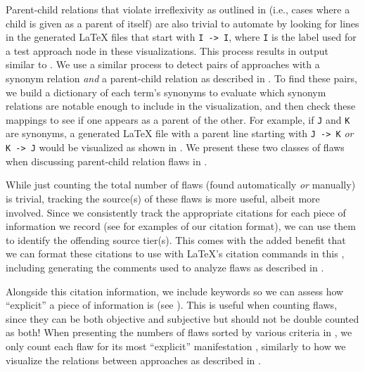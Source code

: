 \ExampleFlawGraphs{}

\label{autoSelfPar}
Parent-child relations that violate irreflexivity as outlined in
 (i.e., cases where a child is given as a parent of itself)
are also trivial to automate by looking for lines in the generated \LaTeX{}
files that start with \texttt{I~->~I}, where \texttt{I} is the label used for a
test approach node in these visualizations. This process results in output
similar to .%
\label{autoParSyn} We use a similar process to detect pairs of
approaches with a synonym relation \emph{and} a parent-child relation as
described in . To find these pairs, we build a dictionary of
each term's synonyms to evaluate which synonym relations are notable enough
to include in the visualization, and then check these mappings to see if one
appears as a parent of the other. For example, if \texttt{J} and \texttt{K} are
synonyms, a generated \LaTeX{} file with a parent line starting with
\texttt{J~->~K} \emph{or} \texttt{K~->~J} would be visualized as shown in
. We present these two
classes of flaws when discussing parent-child relation flaws in .

While just counting the total number of flaws (found automatically \emph{or}
manually) is trivial, tracking
the source(s) of these flaws is more useful, albeit more involved. Since
we consistently track the appropriate citations for each piece of information
we record (see  for examples
of our citation format), we can use them to
identify the offending source tier(s). This comes with the added benefit that
we can format these citations to use with \LaTeX{}'s citation commands in this
\docType{}, including generating the comments used to analyze flaws as
described in .

\label{auto-flaw-analysis-explicitness}
Alongside this citation information, we include keywords so we can assess how
``explicit'' a piece of information is (see ). This is
useful when counting flaws, since they can be both objective and subjective but
should not be double counted as both! When presenting
the numbers of flaws sorted by various criteria in ,
we only count each flaw for its most ``explicit'' manifestation%
, similarly to how we visualize the relations
between approaches as described in .

